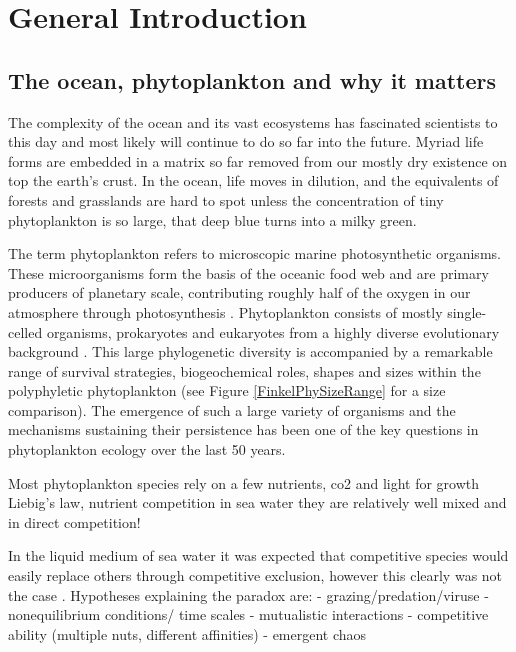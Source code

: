 \chapter{General Introduction}

\section{The ocean, phytoplankton and why it matters}

The complexity of the ocean and its vast ecosystems has fascinated scientists to this day and most likely will continue to do so far into the future. Myriad life forms are embedded in a matrix so far removed from our mostly dry existence on top the earth’s crust. In the ocean, life moves in dilution, and the equivalents of forests and grasslands are hard to spot unless the concentration of tiny phytoplankton is so large, that deep blue turns into a milky green.

The term phytoplankton refers to microscopic marine photosynthetic organisms. These microorganisms form the basis of the oceanic food web and are primary producers of planetary scale, contributing roughly half of the oxygen in our atmosphere through photosynthesis \citep{Field2009}. Phytoplankton consists of mostly single-celled organisms, prokaryotes and eukaryotes from a highly diverse evolutionary background \citep{Falkowski2004a}. This large phylogenetic diversity is accompanied by a remarkable range of survival strategies, biogeochemical roles, shapes and sizes within the polyphyletic phytoplankton (see Figure \ref{FinkelPhySizeRange} for a size comparison). The emergence of such a large variety of organisms and the mechanisms sustaining their persistence has been one of the key questions in phytoplankton ecology over the last 50 years. %

Most phytoplankton species rely on a few nutrients, co2 and light for growth
 Liebig's law, nutrient competition
in sea water they are relatively well mixed and in direct competition!

In the liquid medium of sea water it was expected that competitive species would easily replace others through competitive exclusion, however this clearly was not the case \citep{Hutchinson1961}.   
Hypotheses explaining the paradox are:  
- grazing/predation/viruse
- nonequilibrium conditions/ time scales
- mutualistic interactions
- competitive ability (multiple nuts, different affinities)
- emergent chaos



